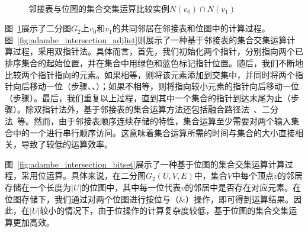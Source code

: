 

\begin{figure} [t]
	\centering
  \\
	\caption{邻接表与位图的集合交集运算比较实例$N(v_0)\cap N(v_1)$}
	
	\label{fig:adambe_intersection}
\end{figure}


\begin{example}
	
	图~\ref{fig:adambe_intersection}展示了二分图$G_2$上$v_0$和$v_1$的共同邻居在邻接表和位图中的计算过程。图~\ref{fig:adambe_intersection_adjlist}则展示了一种基于邻接表的集合交集运算计算过程，采用双指针法。具体而言，首先，我们初始化两个指针，分别指向两个已排序集合的起始位置，并在集合中用绿色和蓝色标记指针位置。随后，我们不断地比较两个指针指向的元素。如果相等，则将该元素添加到交集中，并同时将两个指针向后移动一位（步骤、、）；如果不相等，则将指向较小元素的指针向后移动一位（步骤）。最后，我们重复以上过程，直到其中一个集合的指针到达末尾为止（步骤）。除双指针法外，基于邻接表的集合运算方法还包括融合路径法~\cite{GpuMergePathIntersect14,MergePath18}、二分法~\cite{BinaryIntersect18,triangle18}等。然而，由于邻接表顺序连续存储的特性，集合运算至少需要对两个输入集合中的一个进行串行顺序访问。这意味着集合运算所需的时间与集合的大小直接相关，导致了较低的运算效率。
	
	图~\ref{fig:adambe_intersection_bitset}展示了一种基于位图的集合交集运算计算过程，采用位运算。具体来说，在二分图$G_2(U,V,E)$中，集合$V$中每个顶点$v$的邻居存储在一个长度为$|U|$的位图中，其中每一位代表$v$的邻居中是否存在对应元素。在位图存储下，我们通过对两个位图进行按位与（\&）操作，即可得到运算结果。因此，在$|U|$较小的情况下，由于位操作的计算复杂度较低，基于位图的集合交集运算更加高效。

\end{example}

